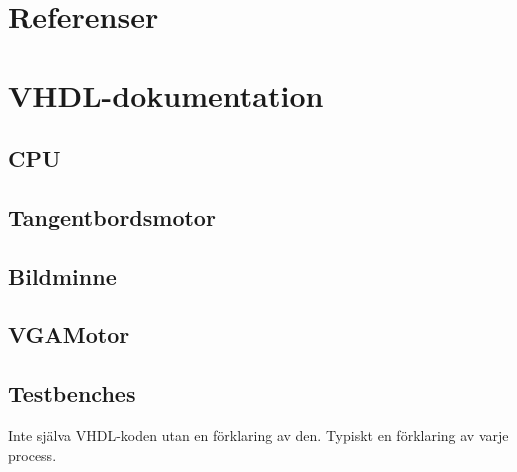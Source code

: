 \documentclass[]{article}
\begin{document}
\section{Referenser}
\section{VHDL-dokumentation}
\subsection{CPU}

\subsection{Tangentbordsmotor}

\subsection{Bildminne}

\subsection{VGAMotor}

\subsection{Testbenches}
Inte själva VHDL-koden utan en förklaring av den. Typiskt en förklaring av varje process.
\end{document}
